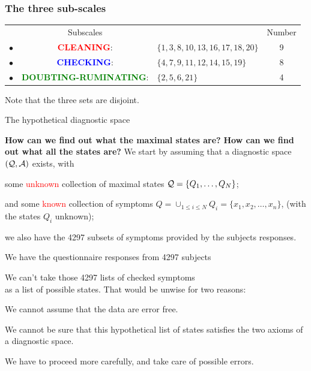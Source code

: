\documentclass{beamer}
\def\tl{\vskip 2mm}
\def\wl{\vskip 4mm}
\def\itbul{\item[$\bullet$]}
\def\AAA{{\cal A}}
\def\QQQ{{\cal Q}}
\def\pha{\phantom}
\def\rtxt#1{\textcolor{red}{#1}}
\def\btxt#1{\textcolor{blue}{#1}}
\def\grtxt#1{\textcolor{green}{#1}}
\begin{document}
\begin{frame}
\frametitle{The three sub-scales}
\begin{tabular}{rclc}
&{\sc Subscales}& \pha{xx}{\sc Sets of Symptoms}&{\sc Number}\\[2mm]
$\bullet$&\rtxt{\small\bf CLEANING}: &{\small $\{1, 3, 8, 10, 13, 16, 17, 18, 20\}$}&9\\[1mm]
$\bullet$&\btxt{\small\bf CHECKING}: &{\small $\{4, 7, 9, 11, 12, 14, 15, 19\}$}&8\\[1mm]
$\bullet$&\grtxt{\small\bf DOUBTING-RUMINATING}:&{\small $\{ 2, 5, 6, 21\}$}&4
\end{tabular}
\wl
Note that the three sets are disjoint.
 \vspace{.5cm}

\end{frame}
\begin{frame}{The hypothetical diagnostic space}
\center
\begin{minipage}{11.5cm} 
\tl
{\bf How can we find out what the maximal states are?}
\wl
{\bf How can we find out what all the states are?}
\wl
We start by assuming that a diagnostic space $(\QQQ,\AAA)$ exists, with
\begin{roster}
\itbul  some \rtxt{unknown} collection of maximal states $\QQQ=\{Q_1,\ldots, Q_N\}$;
\itbul and some \rtxt{known} collection of symptoms $Q=\cup_{1\leq i\leq N}Q_i=\{x_1,x_2,\ldots,x_n\}$, (with the states $Q_i$ unknown);
\itbul we also have the 4297 subsets of symptoms provided by the subjects responses.
\end{roster}

\end{minipage}
 \vspace{.5cm}

\end{frame}
\begin{frame}{We have the questionnaire responses from 4297 subjects}
\center
\begin{minipage}{11cm} We can't take those 4297 lists of checked symptoms\\ as a list of possible states.
\wl
That would be unwise for two reasons:
\begin{roster}
\itbul We cannot assume that the data are error free.
\itbul We cannot be sure that this hypothetical list of states satisfies the two axioms of a diagnostic space.
\end{roster} 
We have to proceed more carefully, and take care of possible errors.

\end{minipage}
 \vspace{.5cm}

\end{frame}
\end{document}
